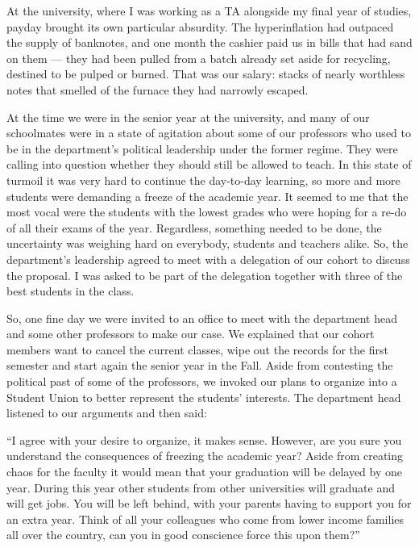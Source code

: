 \documentclass[12pt]{book}
\begin{document}
At the university, where I was working as a TA alongside my final year
of studies, payday brought its own particular absurdity. The
hyperinflation had outpaced the supply of banknotes, and one month the
cashier paid us in bills that had sand on them --- they had been pulled
from a batch already set aside for recycling, destined to be pulped or
burned. That was our salary: stacks of nearly worthless notes that
smelled of the furnace they had narrowly escaped.

At the time we were in the senior year at the university, and many of
our schoolmates were in a state of agitation about some of our
professors who used to be in the department's political leadership under
the former regime. They were calling into question whether they should
still be allowed to teach. In this state of turmoil it was very hard to
continue the day-to-day learning, so more and more students were
demanding a freeze of the academic year. It seemed to me that the most
vocal were the students with the lowest grades who were hoping for a
re-do of all their exams of the year. Regardless, something needed to be
done, the uncertainty was weighing hard on everybody, students and
teachers alike. So, the department's leadership agreed to meet with a
delegation of our cohort to discuss the proposal. I was asked to be part
of the delegation together with three of the best students in the class.

So, one fine day we were invited to an office to meet with the
department head and some other professors to make our case. We explained
that our cohort members want to cancel the current classes, wipe out the
records for the first semester and start again the senior year in the
Fall. Aside from contesting the political past of some of the
professors, we invoked our plans to organize into a Student Union to
better represent the students' interests. The department head listened
to our arguments and then said:

``I agree with your desire to organize, it makes sense. However, are you
sure you understand the consequences of freezing the academic year?
Aside from creating chaos for the faculty it would mean that your
graduation will be delayed by one year. During this year other students
from other universities will graduate and will get jobs. You will be
left behind, with your parents having to support you for an extra year.
Think of all your colleagues who come from lower income families all
over the country, can you in good conscience force this upon them?''
\end{document}
